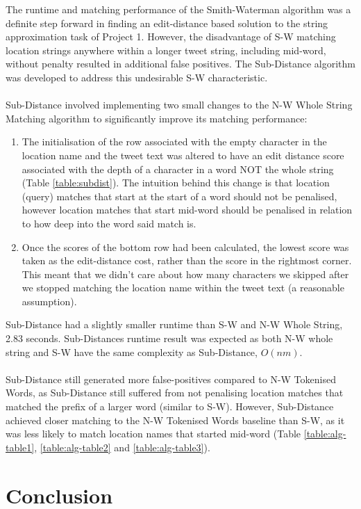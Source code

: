 \documentclass[11pt]{article}
\begin{document}
The runtime and matching performance of the Smith-Waterman algorithm was a definite step forward in finding an edit-distance based solution to the string approximation task of Project 1. However, the disadvantage of S-W matching location strings anywhere within a longer tweet string, including mid-word, without penalty resulted in additional false positives. The Sub-Distance algorithm was developed to address this undesirable S-W characteristic.\\\\
Sub-Distance involved implementing two small changes to the N-W Whole String Matching algorithm to significantly improve its matching performance:
\begin{enumerate}
\item The initialisation of the row associated with the empty character in the location name and the tweet text was altered to have an edit distance score associated with the depth of a character in a word NOT the whole string (Table \ref{table:subdist}). The intuition behind this change is that location (query) matches that start at the start of a word should not be penalised, however location matches that start mid-word should be penalised in relation to how deep into the word said match is.
\item Once the scores of the bottom row had been calculated, the lowest score was taken as the edit-distance cost, rather than the score in the rightmost corner. This meant that we didn't care about how many characters we skipped after we stopped matching the location name within the tweet text (a reasonable assumption). 
\end{enumerate}
Sub-Distance had a slightly smaller runtime than S-W and N-W Whole String, 2.83 seconds. Sub-Distances runtime result was expected as both N-W whole string and S-W have the same complexity as Sub-Distance, $O(nm)$.\\\\
Sub-Distance still generated more false-positives compared to N-W Tokenised Words, as Sub-Distance still suffered from not penalising location matches that matched the prefix of a larger word (similar to S-W). However, Sub-Distance achieved closer matching to the N-W Tokenised Words baseline than S-W, as it was less likely to match location names that started mid-word (Table \ref{table:alg-table1}, \ref{table:alg-table2} and \ref{table:alg-table3}). 


\section{Conclusion}
\end{document}
